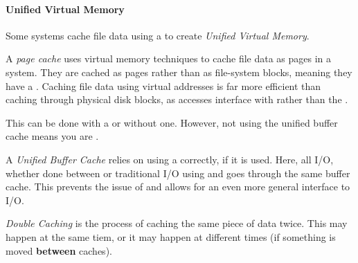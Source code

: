 \paragraph{Unified Virtual Memory}\label{par:Unified_Virtual_Memory}
Some systems cache file data using a  to create \emph{Unified Virtual Memory}.

\begin{definition}\label{def:Page_Cache}
  A \emph{page cache} uses virtual memory techniques to cache file data as pages in a  system.
  They are cached as pages rather than as file-system blocks, meaning they have a .
  Caching file data using virtual addresses is far more efficient than caching through physical disk blocks, as accesses interface with  rather than the .
\end{definition}

This can be done with a  or without one.
However, not using the unified buffer cache means you are .

\begin{definition}\label{def:Unified_Buffer_Cache}
  A \emph{Unified Buffer Cache} relies on using a  correctly, if it is used.
  Here, all I/O, whether done between  or traditional I/O using  and  goes through the same buffer cache.
  This prevents the issue of  and allows for an even more general interface to I/O.
\end{definition}

\begin{definition}\label{def:Double_Caching}
  \emph{Double Caching} is the process of caching the same piece of data twice.
  This may happen at the same tiem, or it may happen at different times (if something is moved \textbf{between} caches).
\end{definition}


